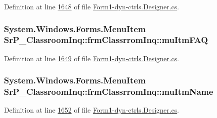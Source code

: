 \-Definition at line \hyperlink{_form1-dyn-ctrls_8_designer_8cs_source_l01648}{1648} of file \hyperlink{_form1-dyn-ctrls_8_designer_8cs_source}{\-Form1-\/dyn-\/ctrls.\-Designer.\-cs}.

\hypertarget{class_sr_p___classroom_inq_1_1frm_classrrom_inq_aecb074ee2d728e4e88009f9a6f3c4f6d}{
\subsubsection[{mu\-Itm\-F\-A\-Q}]{\setlength{\rightskip}{0pt plus 5cm}\-System.\-Windows.\-Forms.\-Menu\-Item {\bf \-Sr\-P\-\_\-\-Classroom\-Inq\-::frm\-Classrrom\-Inq\-::mu\-Itm\-F\-A\-Q}}}
\label{class_sr_p___classroom_inq_1_1frm_classrrom_inq_aecb074ee2d728e4e88009f9a6f3c4f6d}


\-Definition at line \hyperlink{_form1-dyn-ctrls_8_designer_8cs_source_l01649}{1649} of file \hyperlink{_form1-dyn-ctrls_8_designer_8cs_source}{\-Form1-\/dyn-\/ctrls.\-Designer.\-cs}.

\hypertarget{class_sr_p___classroom_inq_1_1frm_classrrom_inq_a62421b36b63800d99afde1f0494d3e5f}{
\subsubsection[{mu\-Itm\-Name}]{\setlength{\rightskip}{0pt plus 5cm}\-System.\-Windows.\-Forms.\-Menu\-Item {\bf \-Sr\-P\-\_\-\-Classroom\-Inq\-::frm\-Classrrom\-Inq\-::mu\-Itm\-Name}}}
\label{class_sr_p___classroom_inq_1_1frm_classrrom_inq_a62421b36b63800d99afde1f0494d3e5f}


\-Definition at line \hyperlink{_form1-dyn-ctrls_8_designer_8cs_source_l01652}{1652} of file \hyperlink{_form1-dyn-ctrls_8_designer_8cs_source}{\-Form1-\/dyn-\/ctrls.\-Designer.\-cs}.

